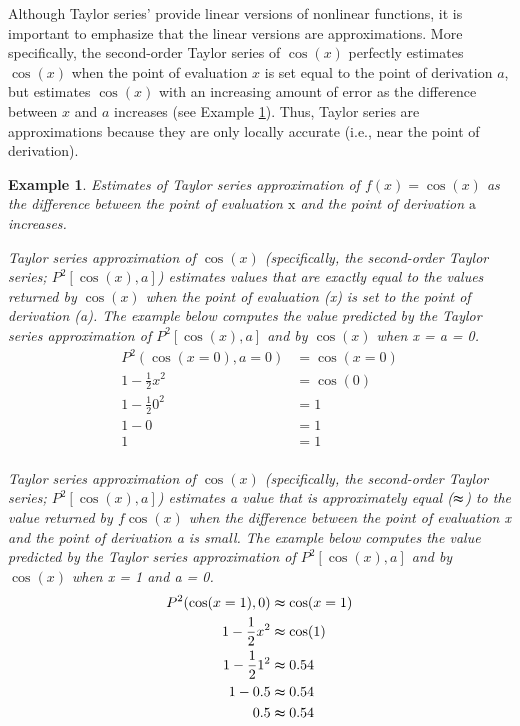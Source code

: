 \documentclass[
12pt, %
twoside,
english]{guelphthesis}
\newtheorem{example}{Example}
\begin{document}
Although Taylor series' provide linear versions of nonlinear functions, it is important to emphasize that the linear versions are approximations. More specifically, the second-order Taylor series of \(\cos(x)\)
perfectly estimates \(\cos(x)\) when the point of evaluation \(x\) is set
equal to the point of derivation \(a\), but estimates \(\cos(x)\) with an
increasing amount of error as the difference between \(x\) and \(a\)
increases (see Example \ref{exm:taylor-estimates}). Thus, Taylor series are approximations because they are only locally accurate (i.e., near the point of derivation).
\begin{example}
\protect\hypertarget{exm:taylor-estimates}{}\label{exm:taylor-estimates}Estimates of Taylor series approximation of \(f(x) = \cos(x)\) as the difference between the point of evaluation \(\mathrm{x}\) and the point of derivation \(\mathrm{a}\) increases.

\textup{Taylor series approximation of $\cos(x)$ (specifically, the second-order Taylor series; $P^2[\cos(x), a]$) estimates values that are exactly equal to the values returned by $\cos(x)$ when the point of evaluation (\textit{x}) is set to the point of derivation (\textit{a}). The example below computes the value predicted by the Taylor series approximation of $P^2[\cos(x), a]$ and by $\cos(x)$ when \textit{x} = \textit{a} = 0.}
\begin{align*}
P^2(\cos(x=0), a=0) &= \cos(x=0) \nonumber \\ 
1- \frac{1}{2}x^2 &=  \cos(0) \nonumber \\ 
1- \frac{1}{2}0^2 &=  1 \nonumber \\ 
1- 0 &=  1 \nonumber \\ 
1 &=  1 \nonumber \\ 
\end{align*}
\vspace*{-25mm}

\textup{Taylor series approximation of $\cos(x)$ (specifically, the second-order Taylor series; $P^2[\cos(x), a]$) estimates a value that is approximately equal ($\thickapprox$) to the value returned by $f\cos(x)$ when the difference between the point of evaluation \textit{x} and the point of derivation \textit{a} is small. The example below computes the value predicted by the Taylor series approximation of $P^2[\cos(x), a]$ and by $\cos(x)$ when \textit{x} = 1 and  \textit{a} = 0.}
\begin{align*}
P^2(\cos(x = 1), 0) &\thickapprox \cos(x = 1) \nonumber \\ 
1- \frac{1}{2}x^2 &\thickapprox   \cos(1) \nonumber \\ 
1- \frac{1}{2}1^2 &\thickapprox   0.54 \nonumber \\ 
1- 0.5 &\thickapprox   0.54 \nonumber \\ 
0.5 &\thickapprox 0.54 \nonumber \\ 
\end{align*}
\vspace*{-25mm}


\end{example}
\end{document}
